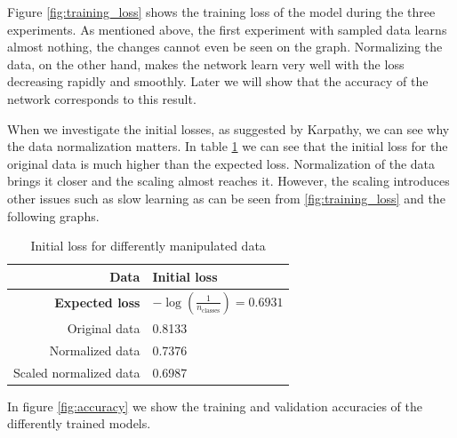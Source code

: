 \documentclass[a4paper,11pt]{article}
\begin{document}
Figure \ref{fig:training_loss} shows the training loss of the model during the three experiments.
As mentioned above, the first experiment with sampled data learns almost nothing, the changes cannot even be seen on the graph.
Normalizing the data, on the other hand, makes the network learn very well with the loss decreasing rapidly and smoothly.
Later we will show that the accuracy of the network corresponds to this result.

When we investigate the initial losses, as suggested by Karpathy, we can see why the data normalization matters.
In table \ref{tab:initial_losses} we can see that the initial loss for the original data is much higher than the expected loss.
Normalization of the data brings it closer and the scaling almost reaches it.
However, the scaling introduces other issues such as slow learning as can be seen from \ref{fig:training_loss} and the following graphs.

\begin{table}[ht]
    \center
    \begin{tabular}{| r | l |}
        \hline
        \textbf{Data}          & \textbf{Initial loss}                                       \\
        \hline
        \hline
        \textbf{Expected loss} & $-\log\left(\frac{1}{n_{\mathrm{classes}}}\right) = 0.6931$ \\
        \hline
        \hline
        Original data          & 0.8133                                                      \\
        Normalized data        & 0.7376                                                      \\
        Scaled normalized data & 0.6987                                                      \\
        \hline
    \end{tabular}
    \caption{Initial loss for differently manipulated data}
    \label{tab:initial_losses}
\end{table}

In figure \ref{fig:accuracy} we show the training and validation accuracies of the differently trained models.
\end{document}

